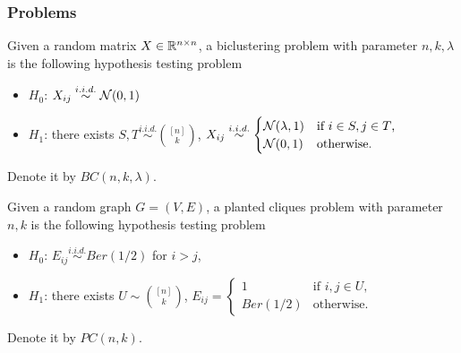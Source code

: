 \subsubsection{Problems}

\begin{prob}[Biclustering]
\label{bc_prob}
Given a random matrix $X\in\mathbb{R}^{n\times n} $, a biclustering problem with parameter $n,k,\lambda$ is the following hypothesis testing problem
\begin{itemize}
    \item $H_0$: $X_{ij}\stackrel{i.i.d.}{\sim}\mathcal{N}(0,1)$
    \item $H_1$: there exists $S,T\stackrel{i.i.d.}{\sim}\binom{[n]}{k}$, $X_{ij}\stackrel{i.i.d.}{\sim}
    \begin{cases}
        \mathcal{N}(\lambda,1) & \text{if $i\in S,j\in T$,}\\
      \mathcal{N}(0,1) & \text{otherwise.}
    \end{cases}$ 
\end{itemize}
Denote it by $BC(n,k,\lambda)$.
\end{prob}

\begin{prob}
\label{pc_prob}
Given a random graph $G=(V,E)$, a planted cliques problem with parameter $n,k$ is the following hypothesis testing problem
\begin{itemize}
    \item $H_0$: $E_{ij}\stackrel{i.i.d.}{\sim}Ber(1/2)$ for $i>j$,
    \item $H_1$: there exists $U\sim\binom{[n]}{k}$, $E_{ij}=
    \begin{cases}
      1 & \text{if $i,j\in U$,}\\
      Ber(1/2) & \text{otherwise.}
    \end{cases}$ 
\end{itemize}
Denote it by $PC(n,k)$.
\end{prob}

